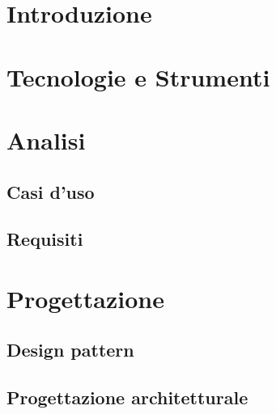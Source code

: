 \documentclass[12pt,a4paper,twoside,openright,english]{book}
\begin{document}
\chapter{Introduzione}\label{introduzione}

\chapter{Tecnologie e Strumenti}\label{tecnologie}

\chapter{Analisi}\label{analisi}

\section{Casi d'uso}\label{usecase}

\section{Requisiti}\label{requisiti}


\chapter{Progettazione}\label{progettazione}

\section{Design pattern}\label{design_pattern}
\section{Progettazione architetturale}\label{progettazione_architetturale}
\end{document}
